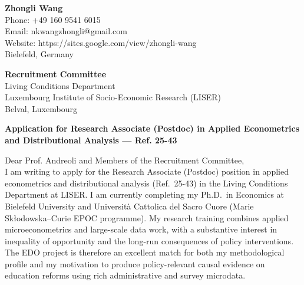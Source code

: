 \documentclass[11pt]{article}
\begin{document}
\noindent
\textbf{Zhongli Wang} \\
Phone: +49 160 9541 6015 \\
Email: nkwangzhongli@gmail.com \\
Website: https://sites.google.com/view/zhongli-wang \\
Bielefeld, Germany \\

\vspace{0.5cm}

\noindent
\textbf{Recruitment Committee} \\
Living Conditions Department \\
Luxembourg Institute of Socio-Economic Research (LISER) \\
Belval, Luxembourg \\

\vspace{0.5cm}

\noindent
\textbf{Application for Research Associate (Postdoc) in Applied Econometrics and Distributional Analysis --- Ref. 25-43} \\

\vspace{0.3cm}

\noindent Dear Prof. Andreoli and Members of the Recruitment Committee,\\[0.2cm]

I am writing to apply for the Research Associate (Postdoc) position in applied econometrics and distributional analysis (Ref.\ 25-43) in the Living Conditions Department at LISER. I am currently completing my Ph.D.\ in Economics at Bielefeld University and Universit\`a Cattolica del Sacro Cuore (Marie Sk{\l}odowska--Curie EPOC programme). My research training combines applied microeconometrics and large-scale data work, with a substantive interest in inequality of opportunity and the long-run consequences of policy interventions. The EDO project is therefore an excellent match for both my methodological profile and my motivation to produce policy-relevant causal evidence on education reforms using rich administrative and survey microdata.
\end{document}
